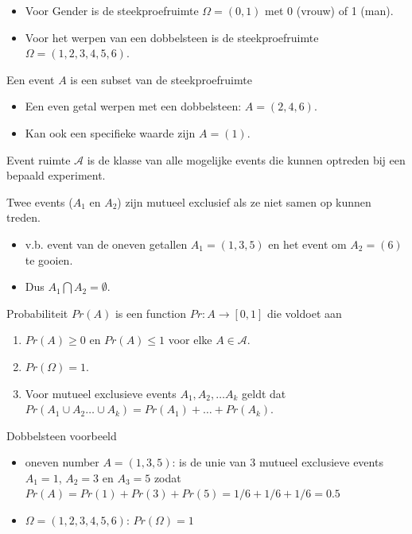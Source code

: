 \documentclass[
  12pt,dutch]{book}
\providecommand{\tightlist}{%
  \setlength{\itemsep}{0pt}\setlength{\parskip}{0pt}}
\theoremstyle{definition}
\theoremstyle{definition}
\theoremstyle{definition}
\theoremstyle{definition}
\theoremstyle{remark}
\begin{document}
\begin{itemize}
\item
  Voor Gender is de steekproefruimte \(\Omega=(0,1)\) met 0 (vrouw) of 1 (man).
\item
  Voor het werpen van een dobbelsteen is de steekproefruimte \(\Omega=(1,2,3,4,5,6)\).
\end{itemize}

Een event \(A\) is een subset van de steekproefruimte

\begin{itemize}
\tightlist
\item
  Een even getal werpen met een dobbelsteen: \(A=(2,4,6)\).
\item
  Kan ook een specifieke waarde zijn \(A=(1)\).
\end{itemize}

Event ruimte \(\mathcal{A}\) is de klasse van alle mogelijke events die kunnen optreden bij een bepaald experiment.

Twee events (\(A_1\) en \(A_2\)) zijn mutueel exclusief als ze niet samen op kunnen treden.

\begin{itemize}
\tightlist
\item
  v.b. event van de oneven getallen \(A_1=(1,3,5)\) en het event om \(A_2=(6)\) te gooien.
\item
  Dus \(A_1 \bigcap A_2=\emptyset\).
\end{itemize}

Probabiliteit \(Pr(A)\) is een function \(Pr: A \rightarrow [0,1]\) die voldoet aan

\begin{enumerate}
\def\labelenumi{\arabic{enumi}.}
\tightlist
\item
  \(Pr(A) \geq 0\) en \(Pr(A) \leq 1\) voor elke \(A \in \mathcal{A}\).
\item
  \(Pr(\Omega)=1\).
\item
  Voor mutueel exclusieve events \(A_1, A_2, \ldots A_k\) geldt dat \(Pr(A_1 \cup A_2 \ldots \cup A_k)= Pr(A_1) + \ldots + Pr(A_k)\).
\end{enumerate}

Dobbelsteen voorbeeld

\begin{itemize}
\tightlist
\item
  oneven number \(A=(1,3,5)\): is de unie van 3 mutueel exclusieve events \(A_1=1\), \(A_2=3\) en \(A_3=5\) zodat
  \(Pr(A)=Pr(1)+Pr(3)+Pr(5)=1/6+1/6+1/6=0.5\)
\item
  \(\Omega=(1,2,3,4,5,6)\): \(Pr(\Omega)=1\)
\end{itemize}
\end{document}
